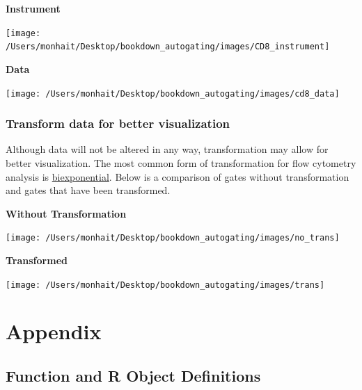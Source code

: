 \documentclass[]{book}
\begin{document}
\textbf{Instrument}

\texttt{[image: /Users/monhait/Desktop/bookdown\_autogating/images/CD8\_instrument]}

\textbf{Data}

\texttt{[image: /Users/monhait/Desktop/bookdown\_autogating/images/cd8\_data]}

\hypertarget{transform-data-for-better-visualization}{%
\subsection{Transform data for better visualization}\label{transform-data-for-better-visualization}}

Although data will not be altered in any way, transformation may allow for better visualization. The most common form of transformation for flow cytometry analysis is \href{http://docs.flowjo.com/vx/graphs-and-gating/gw-transform-overview/}{biexponential}. Below is a comparison of gates without transformation and gates that have been transformed.

\textbf{Without Transformation}

\texttt{[image: /Users/monhait/Desktop/bookdown\_autogating/images/no\_trans]}

\textbf{Transformed}

\texttt{[image: /Users/monhait/Desktop/bookdown\_autogating/images/trans]}

\hypertarget{appendix}{%
\chapter{Appendix}\label{appendix}}

\hypertarget{function-and-r-object-definitions}{%
\section{Function and R Object Definitions}\label{function-and-r-object-definitions}}
\end{document}
